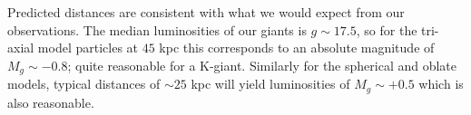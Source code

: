 \documentclass[preprint2]{aastex}
\begin{document}

	Predicted distances are consistent with what we would expect from our observations. The median luminosities of our giants is $g\sim17.5$, so for the tri-axial model particles at $45$ kpc this corresponds to an absolute magnitude of $M_g\sim-0.8$; quite reasonable for a K-giant. Similarly for the spherical and oblate models, typical distances of $\sim25$ kpc will yield luminosities of $M_g\sim+0.5$ which is also reasonable.  
	
\end{document}
